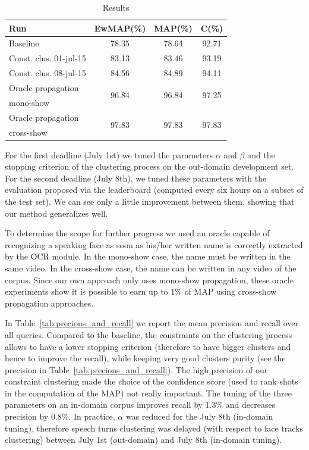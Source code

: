 \documentclass{acm_proc_article-me}
\begin{document}
\begin{table}[ht]
  \centering
  \begin{tabular}{|l|c|c|c|}
    \hline
	Run 						& EwMAP(\%)	& MAP(\%)	& C(\%) \\
	\hline
	\hline
	Baseline					& 78.35		& 78.64		& 92.71		\\
	\hline
	Const. clus. 01-jul-15	& 83.13		& 83.46		& 93.19		\\
	Const. clus. 08-jul-15 	& 84.56		& 84.89		& 94.11		\\
	\hline
	\hline
	Oracle propagation 	& \multirow{2}{*}{96.84}		& \multirow{2}{*}{96.84}		& \multirow{2}{*}{97.25}	\\
	mono-show			&							&							&			\\
	\hline
	Oracle propagation 	& \multirow{2}{*}{97.83}		& \multirow{2}{*}{97.83}		& \multirow{2}{*}{97.83}	\\
	cross-show 			&							&							&			\\
  	\hline
  \end{tabular}
  \caption{Results}
  \label{tab:results}
\end{table}

For the first deadline (July 1st) we tuned the parameters $\alpha$ and $\beta$ and the stopping criterion of the clustering process on the out-domain development set. For the second deadline (July 8th), we tuned these parameters with the evaluation proposed via the leaderboard (computed every six hours on a subset of the test set). We can see only a little improvement between them, showing that our method generalizes well.

To determine the scope for further progress we used an oracle capable of recognizing a speaking face as soon as his/her written name is correctly extracted by the OCR module. In the mono-show case, the name must be written in the same video. In the cross-show case, the name can be written in any video of the corpus. Since our own approach only uses mono-show propagation, these oracle experiments show it is possible to earn up to 1\% of MAP using cross-show propagation approaches.

In Table~\ref{tab:precions_and_recall} we report the mean precision and recall over all queries. Compared to the baseline, the constraints on the clustering process allows to have a lower stopping criterion (therefore to have bigger clusters and hence to improve the recall), while keeping very good clusters purity (see the precision in Table~\ref{tab:precions_and_recall}). The high precision of our constraint clustering made the choice of the confidence score (used to rank shots in the computation of the MAP) not really important. The tuning of the three parameters on an in-domain corpus improves recall by 1.3\% and decreases precision by 0.8\%. In practice, $\alpha$ was reduced for the July 8th (in-domain tuning), therefore speech turns clustering was delayed (with respect to face tracks clustering) between July 1st (out-domain) and July 8th (in-domain tuning).
\end{document}
